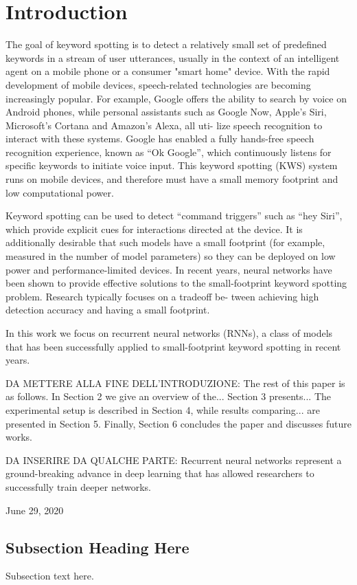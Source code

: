 \documentclass[conference]{IEEEtran}
\begin{document}
\section{Introduction}
The goal of keyword spotting is to detect a relatively small set of predefined keywords in a stream of user utterances, usually in the context of an intelligent agent on a mobile phone or a consumer "smart home" device. With the rapid development of mobile devices, speech-related technologies are becoming increasingly popular. For example, Google offers the ability to search by voice on Android phones, while personal assistants such as Google Now, Apple’s Siri, Microsoft’s Cortana and Amazon’s Alexa, all uti-
lize speech recognition to interact with these systems. Google has enabled a fully hands-free speech recognition experience, known as “Ok Google”, which continuously listens for specific keywords to initiate voice input. This keyword spotting (KWS) system runs on mobile devices, and therefore must have
a small memory footprint and low computational power.

Keyword spotting can be used to detect “command triggers” such as “hey Siri”, which provide explicit cues for interactions directed at the device. It is additionally desirable that such models have a small footprint (for example, measured in the number of model parameters) so they can be deployed on low power and performance-limited devices. In recent years, neural networks have been shown to provide effective solutions to the small-footprint keyword spotting problem. Research typically focuses on a tradeoff be-
tween achieving high detection accuracy and having a small footprint.

In this work we focus on recurrent neural networks (RNNs), a class of models that has been successfully applied to small-footprint keyword spotting in recent years.

DA METTERE ALLA FINE DELL'INTRODUZIONE: The rest of this paper is as follows. In Section 2 we give an overview of the... Section 3 presents... The experimental setup is described in Section 4, while results comparing... are presented in Section 5. Finally, Section 6 concludes the paper and discusses future works.

DA INSERIRE DA QUALCHE PARTE: Recurrent neural networks represent a ground-breaking advance in deep learning that has allowed researchers to successfully train deeper networks.
 
\hfill June 29, 2020

\subsection{Subsection Heading Here}
Subsection text here.
\end{document}
